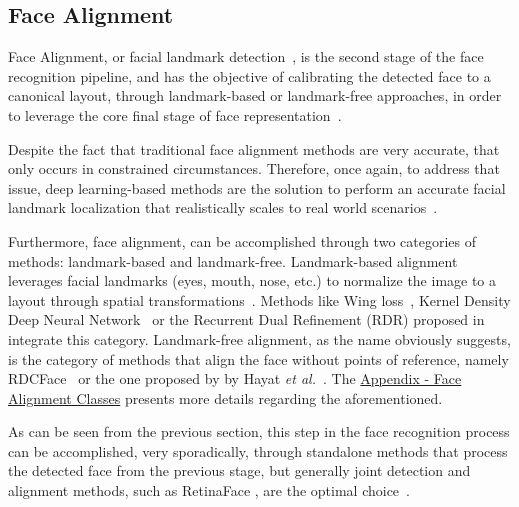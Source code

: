 \documentclass[class=report, crop=false, a4paper, 12pt]{standalone}
\begin{document}
\subsection{Face Alignment}
\par Face Alignment, or facial landmark detection~\autocite{changFacePoseNetMakingCase2017}, is the second stage of the face recognition pipeline, and has the objective of calibrating the detected face to a canonical layout, through landmark-based or landmark-free approaches, in order to leverage the core final stage of face representation~\autocite{duElementsEndtoendDeep2022}. 
\par Despite the fact that traditional face alignment methods are very accurate, that only occurs in constrained circumstances. Therefore, once again, to address that issue, deep learning-based methods are the solution to perform an accurate facial landmark localization that realistically scales to real world scenarios~\autocite{fengWingLossRobust2018}. 
\par Furthermore, face alignment, can be accomplished through two categories of methods: landmark-based and landmark-free. Landmark-based alignment leverages facial landmarks (eyes, mouth, nose, etc.) to normalize the image to a layout through spatial transformations~\autocite{duElementsEndtoendDeep2022}. Methods like Wing loss~\autocite{fengWingLossRobust2018}, Kernel Density Deep Neural Network~\autocite{chenFaceAlignmentKernel2019} or the Recurrent Dual Refinement (RDR) proposed in~\autocite{xiaoRecurrent3D2DDual2017} integrate this category. Landmark-free alignment, as the name obviously suggests, is the category of methods that align the face without points of reference, namely RDCFace~\autocite{zhaoRDCFaceRadialDistortion2020} or the one proposed by by Hayat \textit{et al.}~\autocite{hayatJointRegistrationRepresentation2017}. The \hyperref[sec:face_alignment_appendix]{Appendix - Face Alignment Classes} presents more details regarding the aforementioned.

\vspace{0.7\baselineskip}
\par As can be seen from the previous section, this step in the face recognition process can be accomplished, very sporadically, through standalone methods that process the detected face from the previous stage, but generally joint detection and alignment methods, such as RetinaFace \autocite{dengRetinaFaceSinglestageDense2019}, are the optimal choice~\autocite{changFacePoseNetMakingCase2017}.
\end{document}
